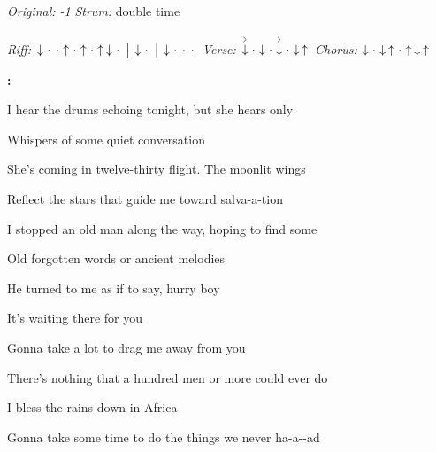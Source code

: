 \begin{song}


\begin{headerbox}
 \quad
\textit{Original: -1} \quad
\textit{Strum:} double time \par
\textit{Riff:} $\Down\Miss\Miss\Up\Miss\Up\Miss\Up\Down\Miss \Separator \Down\Miss \Separator \Down\Miss\Miss\Miss$ \quad
\textit{Verse:} $\AccentDown\Miss\Down\Miss\AccentDown\Miss\Down\Up$ \quad
\textit{Chorus:} $\Down\Miss\Down\Up\Miss\Up\Down\Up$
\end{headerbox}

\begin{hchordbox}
\end{hchordbox}


\bigskip

\Intro\textbf{:}     \par

\bigskip

 I hear the drums echoing tonight, but she hears only \par
{}Whispers of some quiet conversation  \par
{} She's coming in twelve-thirty flight. The moonlit wings \par
Reflect the stars that guide me toward salva-a-tion  \par
{} I stopped an old man along the way, hoping to find some \par
{}Old forgotten words or ancient melodies  \par
{} He turned to me as if to say, hurry boy \par
It's waiting there for you  \par

\bigskip

\begin{chorusboxwide}{\Chorus}
 Gonna take a lot to drag me away from you \par
{} There's nothing that a hundred men or more could ever do \par
{} I bless the rains down in Africa \par
{} Gonna take some time to do the things we never ha-a--ad \par
{}   \par
{}   \par
\end{chorusboxwide}


\end{song}
